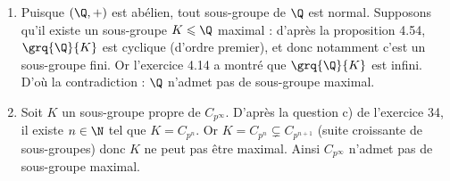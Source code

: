 \begin{enumerate}
\item Puisque $(\Q,+)$ est abélien, tout sous-groupe de $\Q$ est normal. Supposons qu'il existe un sous-groupe $K\leqslant \Q$ maximal : d'après la proposition 4.54, $\grq{\Q}{K}$ est cyclique (d'ordre premier), et donc notamment c'est un sous-groupe fini.
Or l'exercice 4.14 a montré que $\grq{\Q}{K}$ est infini. D'où la contradiction : $\Q$ n'admet pas de sous-groupe maximal.

\item Soit $K$ un sous-groupe propre de $C_{p^{\infty}}$. D'après la question c) de l'exercice 34, il existe $n \in \N$ tel que $K = C_{p^n}$.
Or $K = C_{p^n} \subsetneq C_{p^{n+1}}$ (suite croissante de sous-groupes) donc $K$ ne peut pas être maximal. Ainsi $ C_{p^{\infty}}$ n'admet pas de sous-groupe maximal.

\end{enumerate}
